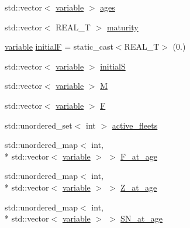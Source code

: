 \begin{DoxyCompactItemize}
\item 
std\-::vector$<$ \hyperlink{structmas_1_1_area_population_info_a154b6c5cf71d1241e90b0f0173dbe32c}{variable} $>$ \hyperlink{structmas_1_1_area_population_info_a4849fa1ac89280ac40ae053fc2c1facf}{ages}
\item 
std\-::vector$<$ R\-E\-A\-L\-\_\-\-T $>$ \hyperlink{structmas_1_1_area_population_info_a69512a2ac34572e7c292d2378fe4042d}{maturity}
\item 
\hyperlink{structmas_1_1_area_population_info_a154b6c5cf71d1241e90b0f0173dbe32c}{variable} \hyperlink{structmas_1_1_area_population_info_acdfe3416f9a818b73fd894371b664c2a}{initial\-F} = static\-\_\-cast$<$R\-E\-A\-L\-\_\-\-T$>$ (0.)
\item 
std\-::vector$<$ \hyperlink{structmas_1_1_area_population_info_a154b6c5cf71d1241e90b0f0173dbe32c}{variable} $>$ \hyperlink{structmas_1_1_area_population_info_aa6937a7e21cc365c77bea5298e745594}{initial\-S}
\item 
std\-::vector$<$ \hyperlink{structmas_1_1_area_population_info_a154b6c5cf71d1241e90b0f0173dbe32c}{variable} $>$ \hyperlink{structmas_1_1_area_population_info_aefb43fab9ad2e986901994bb4212ab18}{M}
\item 
std\-::vector$<$ \hyperlink{structmas_1_1_area_population_info_a154b6c5cf71d1241e90b0f0173dbe32c}{variable} $>$ \hyperlink{structmas_1_1_area_population_info_a95948eb1ffbe50ce1dd4dd1cb9da292e}{F}
\item 
std\-::unordered\-\_\-set$<$ int $>$ \hyperlink{structmas_1_1_area_population_info_ad455e6e80920b7712afeb51d644efde0}{active\-\_\-fleets}
\item 
std\-::unordered\-\_\-map$<$ int, \\*
std\-::vector$<$ \hyperlink{structmas_1_1_area_population_info_a154b6c5cf71d1241e90b0f0173dbe32c}{variable} $>$ $>$ \hyperlink{structmas_1_1_area_population_info_a5638df90f97b38acf6c5421a76fa116b}{F\-\_\-at\-\_\-age}
\item 
std\-::unordered\-\_\-map$<$ int, \\*
std\-::vector$<$ \hyperlink{structmas_1_1_area_population_info_a154b6c5cf71d1241e90b0f0173dbe32c}{variable} $>$ $>$ \hyperlink{structmas_1_1_area_population_info_aa31c41581f5ce29f5041d104c096407e}{Z\-\_\-at\-\_\-age}
\item 
std\-::unordered\-\_\-map$<$ int, \\*
std\-::vector$<$ \hyperlink{structmas_1_1_area_population_info_a154b6c5cf71d1241e90b0f0173dbe32c}{variable} $>$ $>$ \hyperlink{structmas_1_1_area_population_info_a6a1fab6322320fae5353b34c22b710ec}{S\-N\-\_\-at\-\_\-age}

\end{DoxyCompactItemize}

